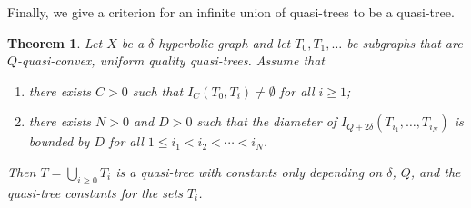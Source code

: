 \documentclass[11pt]{article}
\newtheorem{thm}{Theorem}[section]
\theoremstyle{remark}
\begin{document}
Finally, we give a criterion for an infinite union of quasi-trees to be a quasi-tree.
\begin{thm}\label{quasitreelem}
Let $X$ be a $\delta$-hyperbolic graph and let $T_0, T_1,\dots$ be subgraphs that are $Q$-quasi-convex, uniform quality quasi-trees.
Assume that
\begin{enumerate}
\item there exists $C>0$ such that $I_{C}(T_0, T_i) \neq \emptyset$ for all
$i\ge 1$;
\item there exists $N>0$ and $D>0$ such that the diameter of $I_{Q+2\delta}(T_{i_1}, \dots, T_{i_N})$ is bounded by $D$ for all $1\le i_1 < i_2 < \cdots < i_N$.
\end{enumerate}
Then $T = \displaystyle{\bigcup_{i\ge 0}} T_i$ is a quasi-tree with constants only depending on $\delta$, $Q$, and the quasi-tree constants for the sets $T_i$.
\end{thm}
\end{document}
